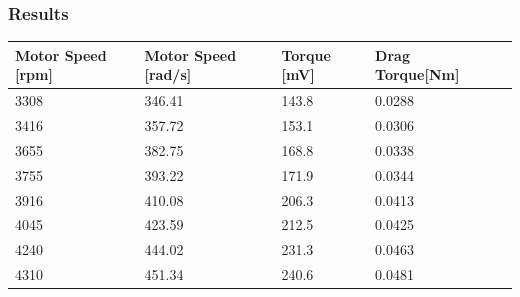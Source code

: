 \subsubsection{Results}
\begin{table}[H]
	\centering
	\begin{tabular}{|l|l|l|l|p{4.3cm}|}
		\hline%
		\textbf{Motor Speed [rpm]}    & \textbf{Motor Speed [rad/s]} & \textbf{Torque [mV]}  & \textbf{Drag Torque[Nm]} \\ 
		\hline%
		3308 						       &  346.41 				           & 143.8                 & 0.0288         \\
		\hline%
		3416                               &  357.72   			               & 153.1                 & 0.0306         \\
		\hline%
		3655                               &  382.75  			               & 168.8                 & 0.0338         \\
		\hline%
		3755                               &  393.22                           & 171.9                 & 0.0344         \\
		\hline%
		3916 						       &  410.08				           & 206.3                 & 0.0413         \\
		\hline%
		4045                               &  423.59    			           & 212.5                 & 0.0425         \\
		\hline%
		4240                               &  444.02                           & 231.3                 & 0.0463         \\
		\hline%
		4310 						       &  451.34			           & 240.6                 & 0.0481         \\
		\hline%
				
	\end{tabular}
\end{table}

